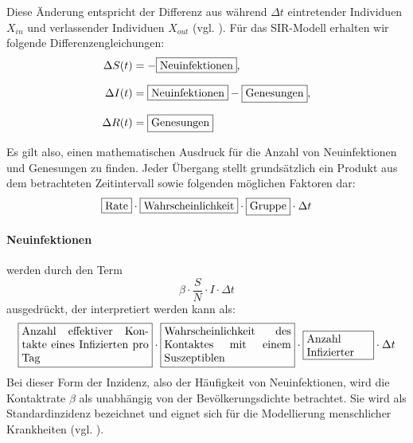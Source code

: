 \documentclass[../main.tex]{subfiles}
\begin{document}
        Diese Änderung entspricht der Differenz aus während $\Delta t$ eintretender Individuen $X_{in}$ und verlassender Individuen $X_{out}$ (vgl. \cite[S. 7]{Li18}).
        Für das SIR-Modell erhalten wir folgende Differenzengleichungen:
        \begin{equation}
            \label{eq:sir_difference_verbose}
            \setlength{\jot}{10pt}
            \begin{aligned}
            \Delta S(t) &= -\fbox{Neuinfektionen}, \\
            \Delta I(t) &= \fbox{Neuinfektionen} - \fbox{Genesungen}, \\
            \Delta R(t) &= \fbox{Genesungen}
            \end{aligned}
        \end{equation}


        Es gilt also, einen mathematischen Ausdruck für die Anzahl von Neuinfektionen und Genesungen zu finden. Jeder Übergang stellt grundsätzlich ein Produkt aus dem betrachteten Zeitintervall sowie folgenden möglichen Faktoren dar:
        \begin{equation*}
            \fbox{Rate} \cdot \fbox{Wahrscheinlichkeit} \cdot \fbox{Gruppe} \cdot \Delta t
        \end{equation*}
        
        \paragraph{Neuinfektionen} werden durch den Term
        \begin{equation*}
            \beta \cdot \frac{S}{N} \cdot I \cdot \Delta t
        \end{equation*}
        ausgedrückt, der interpretiert werden kann als:
        \begin{equation*}
            \fbox{\parbox{4cm}{Anzahl effektiver Kontakte eines Infizierten pro Tag}}
            \cdot
            \fbox{\parbox{4cm}{Wahrscheinlichkeit des Kontaktes mit einem Suszeptiblen}}
            \cdot
            \fbox{\parbox{2cm}{Anzahl \\Infizierter}}
            \cdot
            \Delta t
        \end{equation*}
        Bei dieser Form der Inzidenz, also der Häufigkeit von Neuinfektionen, wird die Kontaktrate $\beta$ als unabhängig von der Bevölkerungsdichte betrachtet. Sie wird als Standardinzidenz bezeichnet und eignet sich für die Modellierung menschlicher Krankheiten (vgl. \cite[S. 602]{Het00}).
\end{document}
